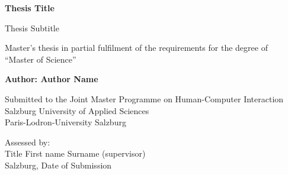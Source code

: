 
\begin{titlepage}
    \begin{center}
        \vspace*{1cm}

        \LARGE
        \textbf{Thesis Title}

        \vspace{0.5cm}
        \LARGE
        Thesis Subtitle

        \vspace{3cm}
        \large
        Master’s thesis in partial fulfilment of the requirements for the degree of\\
        \vspace{1cm}
        “Master of Science”

        \vspace{1.5cm}

        \textbf{Author: Author Name}

        \vfill

        \large
        Submitted to the Joint Master Programme on Human-Computer Interaction\\
        Salzburg University of Applied Sciences\\
        Paris-Lodron-University Salzburg

        \vspace{1.5cm}

        \large
        Assessed by:\\
        Title First name Surname (supervisor)\\
        \vspace{1.5cm}
        Salzburg, Date of Submission

    \end{center}
\end{titlepage}